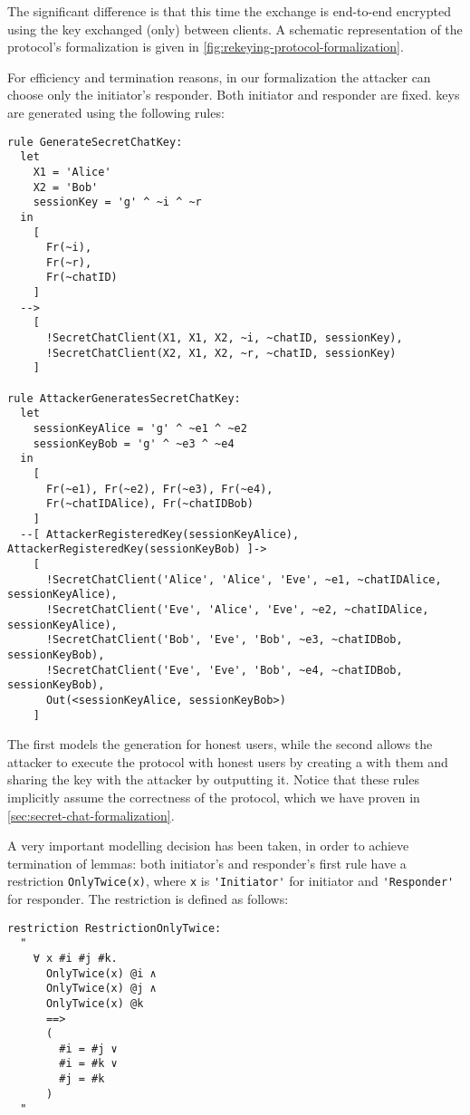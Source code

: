 The significant difference is that this time the \DiHe{} exchange is end-to-end encrypted using the \schat{} key exchanged (only) between clients. A schematic representation of the protocol's formalization is given in \cref{fig:rekeying-protocol-formalization}.

For efficiency and termination reasons, in our formalization the attacker can choose only the initiator's responder. Both initiator and responder are fixed. \Schat{} keys are generated using the following rules:

\newpage

\begin{lstlisting}
rule GenerateSecretChatKey:
  let
    X1 = 'Alice'
    X2 = 'Bob'
    sessionKey = 'g' ^ ~i ^ ~r
  in
    [
      Fr(~i),
      Fr(~r),
      Fr(~chatID)
    ]
  -->
    [ 
      !SecretChatClient(X1, X1, X2, ~i, ~chatID, sessionKey),
      !SecretChatClient(X2, X1, X2, ~r, ~chatID, sessionKey)
    ]

rule AttackerGeneratesSecretChatKey:
  let
    sessionKeyAlice = 'g' ^ ~e1 ^ ~e2
    sessionKeyBob = 'g' ^ ~e3 ^ ~e4
  in
    [ 
      Fr(~e1), Fr(~e2), Fr(~e3), Fr(~e4),
      Fr(~chatIDAlice), Fr(~chatIDBob)
    ]
  --[ AttackerRegisteredKey(sessionKeyAlice), AttackerRegisteredKey(sessionKeyBob) ]->
    [
      !SecretChatClient('Alice', 'Alice', 'Eve', ~e1, ~chatIDAlice, sessionKeyAlice),
      !SecretChatClient('Eve', 'Alice', 'Eve', ~e2, ~chatIDAlice, sessionKeyAlice),
      !SecretChatClient('Bob', 'Eve', 'Bob', ~e3, ~chatIDBob, sessionKeyBob),
      !SecretChatClient('Eve', 'Eve', 'Bob', ~e4, ~chatIDBob, sessionKeyBob),
      Out(<sessionKeyAlice, sessionKeyBob>)
    ]
\end{lstlisting}

The first models the generation for honest users, while the second allows the attacker to execute the protocol with honest users by creating a \schat{} with them and sharing the key with the attacker by outputting it. Notice that these rules implicitly assume the correctness of the \schat{} protocol, which we have proven in \cref{sec:secret-chat-formalization}.

A very important modelling decision has been taken, in order to achieve termination of lemmas: both initiator's and responder's first rule have a restriction \lstinline{OnlyTwice(x)}, where \lstinline{x} is \lstinline{'Initiator'} for initiator and \lstinline{'Responder'} for responder. The restriction is defined as follows:

\begin{lstlisting}
restriction RestrictionOnlyTwice:
  "
    ∀ x #i #j #k. 
      OnlyTwice(x) @i ∧
      OnlyTwice(x) @j ∧
      OnlyTwice(x) @k 
      ==>
      (
        #i = #j ∨
        #i = #k ∨
        #j = #k
      )
  "
\end{lstlisting}

